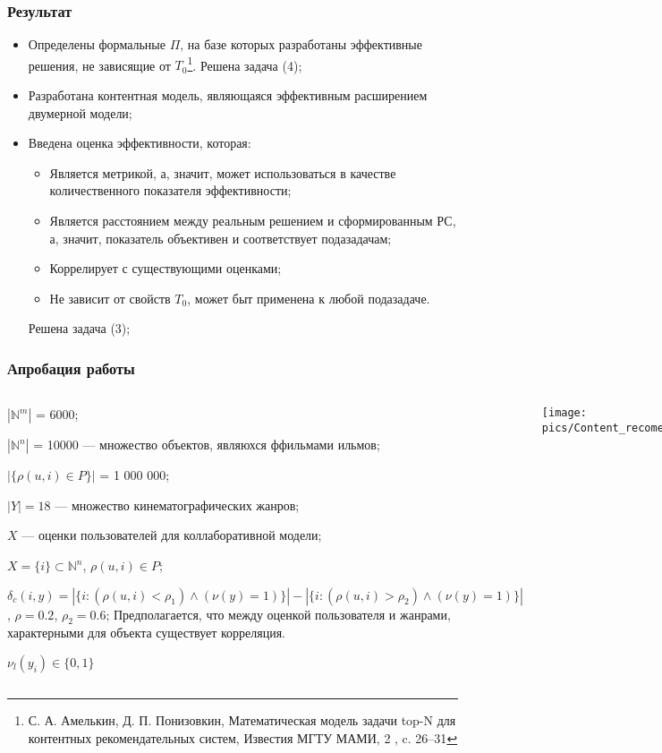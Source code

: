 \documentclass[10pt,xcolor={usenames,dvipsnames}]{beamer}
\theoremstyle{break}
\begin{document}
\begin{frame}
  \frametitle{Результат}
\begin{itemize}
	\item Определены формальные $\Pi$, на базе которых разработаны эффективные
		решения, не зависящие от $T_0$\footnote{С. А. Амелькин, Д. П. Понизовкин, Математическая модель задачи
top-N для контентных рекомендательных систем,
Известия МГТУ МАМИ, 2 , c. 26–31}. Решена задача (4);
\item Разработана контентная модель, являющаяся эффективным расширением
	двумерной модели;
\item Введена оценка эффективности, которая:
	\begin{itemize}
	\item Является метрикой, а, значит, может использоваться в качестве
		количественного показателя эффективности;
	\item Является расстоянием между реальным решением и сформированным РС, а,
		значит, показатель объективен и соответствует подазадачам;
	\item Коррелирует с существующими оценками;
	\item Не зависит от свойств $T_0$, может быт применена к любой подазадаче.
	\end{itemize}
		Решена задача (3);
\end{itemize}
\end{frame}



\begin{frame}
	\frametitle{Апробация работы}
	\begin{columns}[T]
		\begin{itemize}
				\scriptsize{
				\item $|\mathbb{N}^m|$ = 6000;
				\item $|\mathbb{N}^n|$ = 10000 --- множество объектов, являюхся
					ффильмами ильмов;
				\item $|\{ \rho(u, i) \in P \} |$ = 1 000 000;
				\item $|Y| = 18$ --- множество кинематографических жанров;
				\item $X$ --- оценки пользователей для коллаборативной модели;
				\item $X = \{i\} \subset \mathbb{N}^n$, $\rho(u,i) \in P$;
				\item $\delta_c(i, y) = |\{ i : (\rho(u, i) < \rho_1) \wedge (\nu(y) = 1)\}| -
					|\{ i : (\rho(u, i) > \rho_2) \wedge (\nu(y) = 1)\}|$,
				$\rho = 0.2$, $\rho_2 = 0.6$;
				Предполагается, что между оценкой пользователя и жанрами, характерными для объекта существует корреляция.
				\item $\nu_l(y_i) \in \{0,1\}$
					}
		\end{itemize}
		\begin{center}
			\texttt{[image: pics/Content\_recomendat\_poisk.pdf]}
		\end{center}
	\end{columns}
\end{frame}
\end{document}

